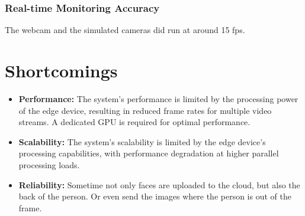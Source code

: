 \documentclass[conference]{IEEEtran}
\begin{document}
\subsubsection{Real-time Monitoring Accuracy}
The webcam and the simulated cameras did run at around 15 fps.

\section{Shortcomings}

\begin{itemize}
      \item \textbf{Performance:} The system's performance is limited by the processing power of the edge device, resulting in reduced frame rates for multiple video streams.
            A dedicated GPU is required for optimal performance.
      \item \textbf{Scalability:} The system's scalability is limited by the edge device's processing capabilities, with performance degradation at higher parallel processing loads.
      \item \textbf{Reliability:} Sometime not only faces are uploaded to the cloud, but also the back of the person. Or even send the images where the person is out of the frame.
\end{itemize}
\end{document}
